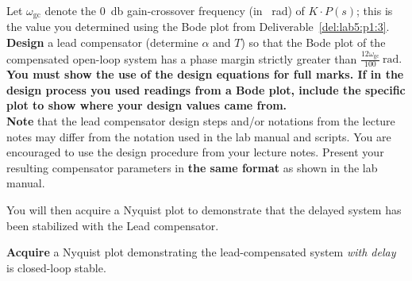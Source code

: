 %
\begin{deliverable}[label={del:lab5:p3:1}]
  Let \(\omega_\mathrm{gc}\) denote the \SI{0}{\decibel} gain-crossover frequency (in \SI{}{\radian}) of \(K \cdot P(s)\); this is the value you determined using the Bode plot from Deliverable~\ref{del:lab5:p1:3}.
  \textbf{Design} a lead compensator (determine \(\alpha\) and \(T\)) so that the Bode plot of the compensated open-loop system has a phase margin strictly greater than \(\frac{12\omega_\mathrm{gc}}{100}~\mathrm{rad}.\)\\
  \textbf{You must show the use of the design equations for full marks. If in the design process you used readings from a Bode plot, include the specific plot to show where your design values came from.}\\
  \textbf{Note} that the lead compensator design steps and/or notations from the lecture notes may differ from the notation used in the lab manual and scripts. You are encouraged to use the design procedure from your lecture notes. Present your resulting compensator parameters in \textbf{the same format} as shown in the lab manual.\\
\end{deliverable}
%
You will then acquire a Nyquist plot to demonstrate that the delayed system has been stabilized with the Lead compensator.
%
\begin{deliverable}[label={del:lab5:p3:2}]
  \textbf{Acquire} a Nyquist plot demonstrating the lead-compensated system \emph{with delay} is closed-loop stable.
\end{deliverable}
%
